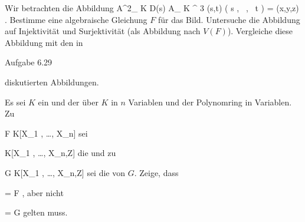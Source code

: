 {}
{





Wir betrachten die Abbildung
\maabbeledisp {} { {\mathbb A}^{2}_{ K } \supseteq D(s) } { { {\mathbb A}_{ K }^{  3   } }
} { (s,t) } { \left(  s  , \,   {  }  , \,   t                 \right) = (x,y,z)
} {.}
Bestimme eine algebraische Gleichung $F$ für das Bild. Untersuche die Abbildung auf Injektivität und Surjektivität (als Abbildung nach $V(F)$). Vergleiche diese Abbildung mit den in

Aufgabe 6.29

diskutierten Abbildungen.





}
{} {}

{}
{





Es sei $K$ ein
und
 der
über $K$ in $n$ Variablen und
 der Polynomring in
 Variablen. Zu

\mavergleichskette
{\vergleichskette
{ F
}
{ \in }{ K[X_1 , \ldots , X_n]
}
{  }{
}
{    }{
}
{   }{
}
}
{}{}{}
sei

\mavergleichskette
{\vergleichskette
{  
}
{ \in }{ K[X_1 , \ldots , X_n,Z]
}
{  }{
}
{    }{
}
{   }{
}
}
{}{}{}
die
 {} {}
und zu

\mavergleichskette
{\vergleichskette
{ G
}
{ \in }{ K[X_1 , \ldots , X_n,Z]
}
{  }{
}
{    }{
}
{   }{
}
}
{}{}{}
sei
 die
 {} {}
von $G$. Zeige, dass

\mavergleichskette
{\vergleichskette
{  
}
{ = }{ F
}
{  }{
}
{    }{
}
{   }{
}
}
{}{}{,}
aber nicht

\mavergleichskette
{\vergleichskette
{ 
}
{ = }{ G
}
{  }{
}
{    }{
}
{   }{
}
}
{}{}{}
gelten muss.





}
{} {}

